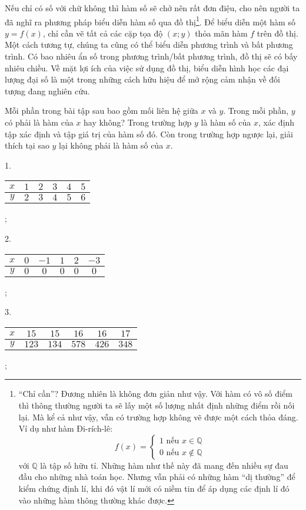 \documentclass[a4paper, titlepage, openany]{book}
\newcounter{exercise}
\newcommand\dblquote[1]{\textquotedblleft #1\textquotedblright}
\begin{document}
Nếu chỉ có số với chữ không thì hàm số sẽ chở nên rất đơn điệu, cho nên người ta đã nghĩ ra phương pháp biểu diễn hàm số qua đồ thị\footnote{\dblquote{Chỉ cần}? Đương nhiên là không đơn giản như vậy. Với hàm có vô số điểm thì thông thường người ta sẽ lấy một số lượng nhất định những điểm rồi nối lại. Mà kể cả như vậy, vẫn có trường hợp không vẽ được một cách thỏa đáng. Ví dụ như hàm Đi-rích-lê: $$f(x) =
\begin{cases}
   1 \text{ nếu } x\in \mathbb{Q} \\
   0 \text{ nếu } x\notin \mathbb{Q}
\end{cases}$$ với $\mathbb{Q}$ là tập số hữu tỉ. Những hàm như thế này đã mang đến nhiều sự đau đầu cho những nhà toán học. Nhưng vẫn phải có những hàm \dblquote{dị thường} để kiểm chứng định lí, khi đó vật lí mới có niềm tin để áp dụng các định lí đó vào những hàm thông thường khác được.}. Để biểu diễn một hàm số $y=f(x)$, chỉ cần vẽ tất cả các cặp tọa độ $(x; y)$ thỏa mãn hàm $f$ trên đồ thị. Một cách tương tự, chúng ta cũng có thể biểu diễn phương trình và bất phương trình. Có bao nhiêu ẩn số trong phương trình/bất phương trình, đồ thị sẽ có bấy nhiêu chiều. Về mặt lợi ích của việc sử dụng đồ thị, biểu diễn hình học các đại lượng đại số là một trong những cách hữu hiệu để mở rộng cảm nhận về đối tượng đang nghiên cứu. 
      
\exercise Mỗi phần trong bài tập sau bao gồm mối liên hệ giữa $x$ và $y$. Trong mỗi phần, $y$ có phải là hàm của $x$ hay không? Trong trường hợp $y$ là hàm số của $x$, xác định tập xác định và tập giá trị của hàm số đó. Còn trong trường hợp ngược lại, giải thích tại sao $y$ lại không phải là hàm số của $x$.

1.
\begin{tabular}{|c|c|c|c|c|c|}
   \hline
   $x$ & $1$ & $2$ & $3$ & $4$ & $5$ \\
   \hline
   $y$ & $2$ & $3$ & $4$ & $5$ & $6$ \\
   \hline
\end{tabular};

2.
\begin{tabular}{|c|c|c|c|c|c|}
   \hline
   $x$ & $0$ & $-1$ & $1$ & $2$ & $-3$ \\
   \hline
   $y$ & $0$ & $0$ & $0$ & $0$ & $0$ \\
   \hline
\end{tabular};

3.
\begin{tabular}{|c|c|c|c|c|c|}
   \hline
   $x$ & $15$ & $15$ & $16$ & $16$ & $17$ \\
   \hline
   $y$ & $123$ & $134$ & $578$ & $426$ & $348$ \\
   \hline
\end{tabular};
\end{document}
